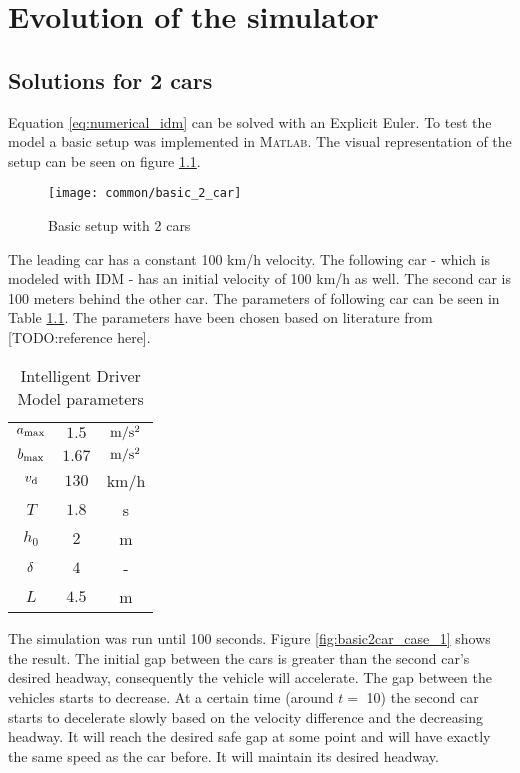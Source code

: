 \chapter{Evolution of the simulator}
	\section{Solutions for 2 cars}\label{sec:base2car}
		Equation \ref{eq:numerical_idm} can be solved with an Explicit Euler. To test the model a basic setup was implemented in \textsc{Matlab}. The visual representation of the setup can be seen on figure \ref{fig:basic2car}.
		\begin{figure}
			\centering
			\texttt{[image: common/basic\_2\_car]}
			\caption{Basic setup with 2 cars}
			\label{fig:basic2car}
		\end{figure}
		The leading car has a constant 100 km/h velocity. The following car - which is modeled with IDM - has an initial velocity of 100 km/h as well. The second car is 100 meters behind the other car. The parameters of following car can be seen in Table \ref{tab:idm_params}. The parameters have been chosen based on literature from [TODO:reference here].
		\begin{table}
			\begin{center}
				\begin{tabular}{ |c|c|c| }
					\hline
					$a_{\rm max}$ & $1.5$ & $\rm m/s^2$ \\
					$b_{\rm max}$ & $1.67$ & $\rm m/s^2$ \\
					$v_{\rm d}$ & $130$ & km/h \\
					$T$ & $1.8$ & s \\
					$h_0$ & $2$ & m \\
					$\rm \delta$ & $4$ & - \\
					$L$ & $4.5$ & m \\
					\hline
				\end{tabular}
			\end{center}
			\caption{Intelligent Driver Model parameters}
			\label{tab:idm_params}
		\end{table}
		The simulation was run until 100 seconds. Figure \ref{fig:basic2car_case_1} shows the result. The initial gap between the cars is greater than the second car's desired headway, consequently the vehicle will accelerate. The gap between the vehicles starts to decrease. At a certain time (around $t =$ 10) the second car starts to decelerate slowly based on the velocity difference and the decreasing headway. It will reach the desired safe gap at some point and will have exactly the same speed as the car before. It will maintain its desired headway.
